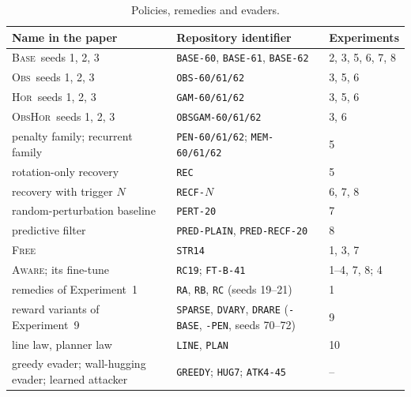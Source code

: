 \documentclass{l4dc2027}
\newcommand{\Base}{\textsc{Base}}
\newcommand{\Obs}{\textsc{Obs}}
\newcommand{\Hor}{\textsc{Hor}}
\newcommand{\ObsHor}{\textsc{ObsHor}}
\newcommand{\Free}{\textsc{Free}}
\newcommand{\Aware}{\textsc{Aware}}
\begin{document}
\begin{table}[h]
\centering\footnotesize
\caption{Policies, remedies and evaders.}
\scriptsize\setlength{\tabcolsep}{4pt}
\begin{tabular}{@{}lll@{}}
\toprule
Name in the paper & Repository identifier & Experiments \\
\midrule
\Base\ seeds 1, 2, 3 & \texttt{BASE-60}, \texttt{BASE-61}, \texttt{BASE-62} & 2, 3, 5, 6, 7, 8 \\
\Obs\ seeds 1, 2, 3 & \texttt{OBS-60/61/62} & 3, 5, 6 \\
\Hor\ seeds 1, 2, 3 & \texttt{GAM-60/61/62} & 3, 5, 6 \\
\ObsHor\ seeds 1, 2, 3 & \texttt{OBSGAM-60/61/62} & 3, 6 \\
penalty family; recurrent family & \texttt{PEN-60/61/62}; \texttt{MEM-60/61/62} & 5 \\
rotation-only recovery & \texttt{REC} & 5 \\
recovery with trigger $N$ & \texttt{RECF-}$N$ & 6, 7, 8 \\
random-perturbation baseline & \texttt{PERT-20} & 7 \\
predictive filter & \texttt{PRED-PLAIN}, \texttt{PRED-RECF-20} & 8 \\
\Free & \texttt{STR14} & 1, 3, 7 \\
\Aware; its fine-tune & \texttt{RC19}; \texttt{FT-B-41} & 1--4, 7, 8; 4 \\
remedies of Experiment~1 & \texttt{RA}, \texttt{RB}, \texttt{RC} (seeds 19--21) & 1 \\
reward variants of Experiment~9 & \texttt{SPARSE}, \texttt{DVARY}, \texttt{DRARE} (\texttt{-BASE}, \texttt{-PEN}, seeds 70--72) & 9 \\
line law, planner law & \texttt{LINE}, \texttt{PLAN} & 10 \\
greedy evader; wall-hugging evader; learned attacker & \texttt{GREEDY}; \texttt{HUG7}; \texttt{ATK4-45} & -- \\
\bottomrule
\end{tabular}
\end{table}
\end{document}
